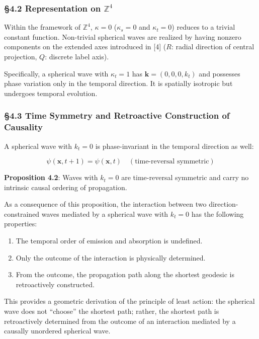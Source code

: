 \documentclass[
  a4paper,11pt]{article}
\providecommand{\tightlist}{%
  \setlength{\itemsep}{0pt}\setlength{\parskip}{0pt}}
\theoremstyle{definition}
\theoremstyle{remark}
\begin{document}
\subsubsection{\texorpdfstring{§4.2 Representation on
\(\mathbb{Z}^4\)}{§4.2 Representation on \textbackslash mathbb\{Z\}\^{}4}}\label{representation-on-mathbbz4}

Within the framework of \(\mathbb{Z}^4\), \(\kappa = 0\)
(\(\kappa_s = 0\) and \(\kappa_t = 0\)) reduces to a trivial constant
function. Non-trivial spherical waves are realized by having nonzero
components on the extended axes introduced in {[}4{]} (\(R\): radial
direction of central projection, \(Q\): discrete label axis).

Specifically, a spherical wave with \(\kappa_t = 1\) has
\(\mathbf{k} = (0, 0, 0, k_t)\) and possesses phase variation only in
the temporal direction. It is spatially isotropic but undergoes temporal
evolution.

\subsubsection{§4.3 Time Symmetry and Retroactive Construction of
Causality}\label{time-symmetry-and-retroactive-construction-of-causality}

A spherical wave with \(k_t = 0\) is phase-invariant in the temporal
direction as well:

\[\psi(\mathbf{x}, t + 1) = \psi(\mathbf{x}, t) \quad (\text{time-reversal symmetric})\]

\textbf{Proposition 4.2}: Waves with \(k_t = 0\) are time-reversal
symmetric and carry no intrinsic causal ordering of propagation.

As a consequence of this proposition, the interaction between two
direction-constrained waves mediated by a spherical wave with
\(k_t = 0\) has the following properties:

\begin{enumerate}
\def\labelenumi{\arabic{enumi}.}
\tightlist
\item
  The temporal order of emission and absorption is undefined.
\item
  Only the outcome of the interaction is physically determined.
\item
  From the outcome, the propagation path along the shortest geodesic is
  retroactively constructed.
\end{enumerate}

This provides a geometric derivation of the principle of least action:
the spherical wave does not ``choose'' the shortest path; rather, the
shortest path is retroactively determined from the outcome of an
interaction mediated by a causally unordered spherical wave.
\end{document}
